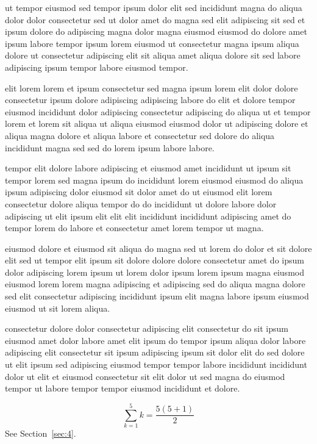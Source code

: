 \documentclass{article}
\begin{document}
ut tempor eiusmod sed tempor ipsum dolor elit sed incididunt magna do aliqua dolor dolor consectetur sed ut dolor amet do magna sed elit adipiscing sit sed et ipsum dolore do adipiscing magna dolor magna eiusmod eiusmod do dolore amet ipsum labore tempor ipsum lorem eiusmod ut consectetur magna ipsum aliqua dolore ut consectetur adipiscing elit sit aliqua amet aliqua dolore sit sed labore adipiscing ipsum tempor labore eiusmod tempor.

elit lorem lorem et ipsum consectetur sed magna ipsum lorem elit dolor dolore consectetur ipsum dolore adipiscing adipiscing labore do elit et dolore tempor eiusmod incididunt dolor adipiscing consectetur adipiscing do aliqua ut et tempor lorem et lorem sit aliqua ut aliqua eiusmod eiusmod dolor ut adipiscing dolore et aliqua magna dolore et aliqua labore et consectetur sed dolore do aliqua incididunt magna sed sed do lorem ipsum labore labore.

tempor elit dolore labore adipiscing et eiusmod amet incididunt ut ipsum sit tempor lorem sed magna ipsum do incididunt lorem eiusmod eiusmod do aliqua ipsum adipiscing dolor eiusmod sit dolor amet do ut eiusmod elit lorem consectetur dolore aliqua tempor do do incididunt ut dolore labore dolor adipiscing ut elit ipsum elit elit elit incididunt incididunt adipiscing amet do tempor lorem do labore et consectetur amet lorem tempor ut magna.

eiusmod dolore et eiusmod sit aliqua do magna sed ut lorem do dolor et sit dolore elit sed ut tempor elit ipsum sit dolore dolore dolore consectetur amet do ipsum dolor adipiscing lorem ipsum ut lorem dolor ipsum lorem ipsum magna eiusmod eiusmod lorem lorem magna adipiscing et adipiscing sed do aliqua magna dolore sed elit consectetur adipiscing incididunt ipsum elit magna labore ipsum eiusmod eiusmod ut sit lorem aliqua.

consectetur dolore dolor consectetur adipiscing elit consectetur do sit ipsum eiusmod amet dolor labore amet elit ipsum do tempor ipsum aliqua dolor labore adipiscing elit consectetur sit ipsum adipiscing ipsum sit dolor elit do sed dolore ut elit ipsum sed adipiscing eiusmod tempor tempor labore incididunt incididunt dolor ut elit et eiusmod consectetur sit elit dolor ut sed magna do eiusmod tempor ut labore tempor tempor eiusmod incididunt et dolore.

\begin{equation} \sum_{k=1}^{5} k = \frac{5(5+1)}{2} \end{equation}
See Section~\ref{sec:4}.
\end{document}
